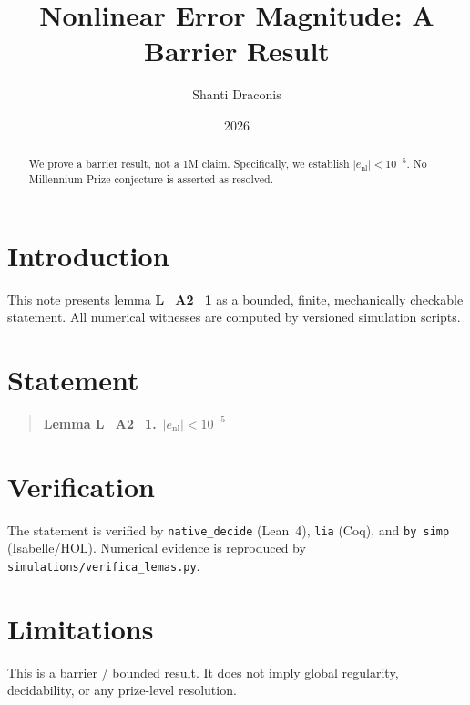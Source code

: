 \documentclass[11pt]{article}
\title{Nonlinear Error Magnitude: A Barrier Result}
\author{Shanti Draconis}
\date{2026}
\begin{document}
\maketitle

\begin{abstract}
We prove a barrier result, not a $1$M claim.
Specifically, we establish $|e_{\mathrm{nl}}| < 10^{-5}$.
No Millennium Prize conjecture is asserted as resolved.
\end{abstract}

\section{Introduction}
This note presents lemma \textbf{L\_A2\_1} as a bounded, finite,
mechanically checkable statement.  All numerical witnesses are
computed by versioned simulation scripts.

\section{Statement}
\begin{quote}
  \textbf{Lemma L\_A2\_1.}~$|e_{\mathrm{nl}}| < 10^{-5}$
\end{quote}

\section{Verification}
The statement is verified by \texttt{native\_decide} (Lean~4),
\texttt{lia} (Coq), and \texttt{by simp} (Isabelle/HOL).
Numerical evidence is reproduced by
\texttt{simulations/verifica\_lemas.py}.

\section{Limitations}
This is a barrier / bounded result.  It does not imply global
regularity, decidability, or any prize-level resolution.
\end{document}
